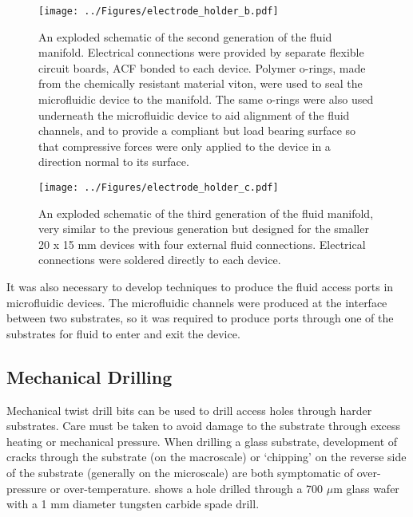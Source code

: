 \begin{figure}[p]
	\centering
		\texttt{[image: ../Figures/electrode\_holder\_b.pdf]}
	\caption[Exploded schematic of the second generation of the fluid manifold.]{An exploded schematic of the second generation of the fluid manifold. Electrical connections were provided by separate flexible circuit boards, ACF bonded to each device. Polymer o-rings, made from the chemically resistant material viton, were used to seal the microfluidic device to the manifold. The same o-rings were also used underneath the microfluidic device to aid alignment of the fluid channels, and to provide a compliant but load bearing surface so that compressive forces were only applied to the device in a direction normal to its surface.}
	\label{fig:electrode_holder_b}
\end{figure}

\begin{figure}[p]
	\centering
		\texttt{[image: ../Figures/electrode\_holder\_c.pdf]}
	\caption[Exploded schematic of the third generation of the fluid manifold.]{An exploded schematic of the third generation of the fluid manifold, very similar to the previous generation but designed for the smaller 20 x 15 mm devices with four external fluid connections. Electrical connections were soldered directly to each device.}
	\label{fig:electrode_holder_c}
\end{figure}

It was also necessary to develop techniques to produce the fluid access ports in microfluidic devices. The microfluidic channels were produced at the interface between two substrates, so it was required to produce ports through one of the substrates for fluid to enter and exit the device.

\pagebreak
\clearpage

\subsection{Mechanical Drilling}
\label{Section:Spade_drilling}
Mechanical twist drill bits can be used to drill access holes through harder substrates. Care must be taken to avoid damage to the substrate through excess heating or mechanical pressure. When drilling a glass substrate, development of cracks through the substrate (on the macroscale) or `chipping' on the reverse side of the substrate (generally on the microscale) are both symptomatic of over-pressure or over-temperature.  shows a hole drilled through a 700 $\mu$m glass wafer with a 1 mm diameter tungsten carbide spade drill.

